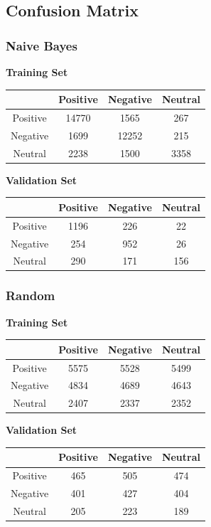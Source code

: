\documentclass[12pt,a4paper]{article}
\begin{document}
\subsection{Confusion Matrix}

\subsubsection{Naive Bayes}

\textbf{Training Set}
\begin{center}
\begin{tabular}{|c|c|c|c|}
\hline
 & Positive & Negative & Neutral \\
\hline
Positive & 14770 & 1565 & 267 \\
\hline
Negative & 1699 & 12252 & 215 \\
\hline
Neutral & 2238 & 1500 & 3358 \\
\hline
\end{tabular}
\end{center}

\textbf{Validation Set}
\begin{center}
\begin{tabular}{|c|c|c|c|}
\hline
 & Positive & Negative & Neutral \\
\hline
Positive & 1196 & 226 & 22 \\
\hline
Negative & 254 & 952 & 26 \\
\hline
Neutral & 290 & 171 & 156 \\
\hline
\end{tabular}
\end{center}

\subsubsection{Random}

\textbf{Training Set}
\begin{center}
\begin{tabular}{|c|c|c|c|}
\hline
 & Positive & Negative & Neutral \\
\hline
Positive & 5575 & 5528 & 5499 \\
\hline
Negative & 4834 & 4689 & 4643 \\
\hline
Neutral & 2407 & 2337 & 2352 \\
\hline
\end{tabular}
\end{center}

\textbf{Validation Set}
\begin{center}
\begin{tabular}{|c|c|c|c|}
\hline
 & Positive & Negative & Neutral \\
\hline
Positive & 465 & 505 & 474 \\
\hline
Negative & 401 & 427 & 404 \\
\hline
Neutral & 205 & 223 & 189 \\
\hline
\end{tabular}
\end{center}
\end{document}

